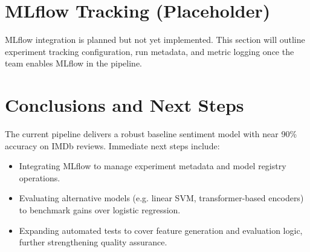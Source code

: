 \documentclass[11pt,a4paper]{article}
\begin{document}
\section{MLflow Tracking (Placeholder)}
MLflow integration is planned but not yet implemented. This section will outline experiment tracking configuration, run metadata, and metric logging once the team enables MLflow in the pipeline.

\section{Conclusions and Next Steps}
The current pipeline delivers a robust baseline sentiment model with near 90\% accuracy on IMDb reviews. Immediate next steps include:
\begin{itemize}[leftmargin=*]
  \item Integrating MLflow to manage experiment metadata and model registry operations.
  \item Evaluating alternative models (e.g. linear SVM, transformer-based encoders) to benchmark gains over logistic regression.
  \item Expanding automated tests to cover feature generation and evaluation logic, further strengthening quality assurance.
\end{itemize}
\end{document}
